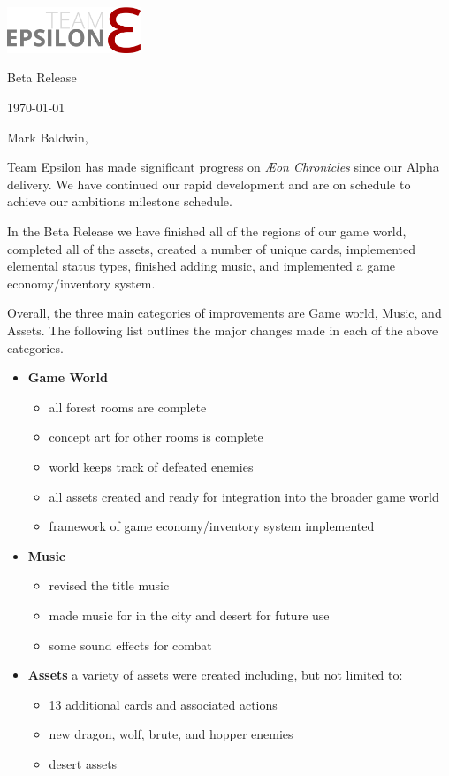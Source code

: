 \documentclass[12pt]{article}
\newcommand\aeon{\textit{\AE on Chronicles}\xspace}
\newcommand\releasename{Beta Release\xspace}
\newcommand\te{Team Epsilon\xspace}
\begin{document}
\hfill\includegraphics[width=4cm]{../graphics/logo/team-epsilon-light-cropped}

\hfill \releasename

\hfill \today

Mark Baldwin,

\te has made significant progress on \aeon since our Alpha delivery. We have
continued our rapid development and are on schedule to achieve our ambitions
milestone schedule.

In the \releasename we have finished all of the regions of our game world,
completed all of the assets, created a number of unique cards, implemented
elemental status types, finished adding music, and implemented a game
economy/inventory system.

Overall, the three main categories of improvements are Game world, Music, and
Assets. The following list outlines the major changes made in each of the above
categories.

\begin{itemize}
    \item \textbf{Game World}
        \begin{itemize}[noitemsep]
            \item all forest rooms are complete
            \item concept art for other rooms is complete
            \item world keeps track of defeated enemies
            \item all assets created and ready for integration into the broader
                game world
            \item framework of game economy/inventory system implemented
        \end{itemize}

    \item \textbf{Music}
        \begin{itemize}[noitemsep]
            \item revised the title music
            \item made music for in the city and desert for future use
            \item some sound effects for combat
        \end{itemize}

    \item \textbf{Assets} a variety of assets were created including, but not
        limited to:
        \begin{itemize}[noitemsep]
            \item 13 additional cards and associated actions
            \item new dragon, wolf, brute, and hopper enemies
            \item desert assets
        \end{itemize}
\end{itemize}
\end{document}
